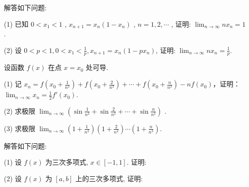 解答如下问题:\par
(1) 已知  $0 < x_{1} < 1$ ,  $x_{n+1} = x_{n}(1 - x_{n})$ ,  $n = 1, 2, \cdots$ , 证明:  $\lim_{n \to \infty} nx_{n} = 1$ .\par
(2) 设 $0 < p < 1, 0 < x_{1} < \frac{1}{p}, x_{n+1} = x_{n}(1 - px_{n})$, 证明: $\lim_{n \to \infty} nx_{n} = \frac{1}{p}$.\par
设函数 $f(x)$ 在点 $x = x_0$ 处可导.\par
(1) 记 $x_{n} = f\left(x_{0} + \frac{1}{n^{2}}\right) + f\left(x_{0} + \frac{2}{n^{2}}\right) + \cdots + f\left(x_{0} + \frac{n}{n^{2}}\right) - nf(x_{0})$，证明：$\lim_{n \to \infty} x_{n} = \frac{1}{2} f'(x_{0})$.\par
(2) 求极限  $\lim_{n\to\infty}\left(\sin\frac{1}{n^{2}}+\sin\frac{2}{n^{2}}+\cdots+\sin\frac{n}{n^{2}}\right)$ .\par
(3) 求极限  $\lim_{n\to\infty}\left(1+\frac{1}{n^{2}}\right)\left(1+\frac{2}{n^{2}}\right)\cdots\left(1+\frac{n}{n^{2}}\right).$\par
解答如下问题:\par
\par{}
(1) 设 $f(x)$ 为三次多项式, $x \in [-1, 1]$. 证明:\par
\nopagebreak[4]
\par{}
(2) 设 $f(x)$ 为 $[a, b]$ 上的三次多项式, 证明:\par
\nopagebreak[4]
